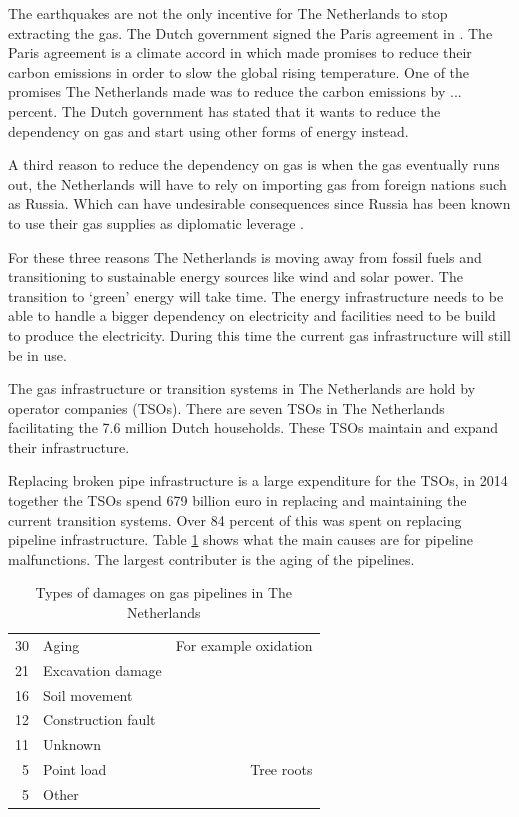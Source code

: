 The earthquakes are not the only incentive for The Netherlands to stop extracting the gas. The Dutch government signed the Paris agreement in . The Paris agreement is a climate accord in which  made promises to reduce their carbon emissions in order to slow the global rising temperature. One of the promises The Netherlands made was to reduce the carbon emissions by ... percent. The Dutch government has stated that it wants to reduce the dependency on gas and start using other forms of energy instead. 

A third reason to reduce the dependency on gas is when the gas eventually runs out, the Netherlands will have to rely on importing gas from foreign nations such as Russia. Which can have undesirable consequences since Russia has been known to use their gas supplies as diplomatic leverage .

For these three reasons The Netherlands is moving away from fossil fuels and transitioning to sustainable energy sources like wind and solar power. The transition to `green' energy will take time. The energy infrastructure needs to be able to handle a bigger dependency on electricity and facilities need to be build to produce the electricity. During this time the current gas infrastructure will still be in use.


The gas infrastructure or transition systems in The Netherlands are hold by operator companies (TSOs). There are seven TSOs in The Netherlands facilitating the 7.6  million Dutch households. These TSOs maintain and expand their infrastructure. 

Replacing broken pipe infrastructure is a large expenditure for the TSOs, in 2014 together the TSOs spend 679 billion euro  in replacing and maintaining the current transition systems. Over 84 percent of this was spent on replacing pipeline infrastructure. Table \ref{tab:damages-pipelines} shows what the main causes are for pipeline malfunctions. The largest contributer is the aging of the pipelines. 

\begin{table}
\begin{tabular}{ r | l | r}
  30 & Aging & For example oxidation\\
  21 & Excavation damage & \\
  16 & Soil movement & \\
  12 & Construction fault &\\
  11 & Unknown & \\
  5 & Point load & Tree roots\\
  5 & Other & \\
\end{tabular}
\caption{Types of damages on gas pipelines in The Netherlands }
\label{tab:damages-pipelines}
\end{table}

